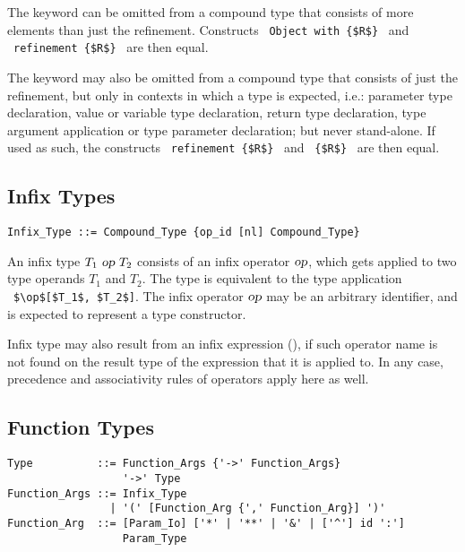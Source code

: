 The  keyword can be omitted from a compound type that consists of more elements than just the refinement. Constructs ~\lstinline!Object with {$R$}!~ and ~\lstinline!refinement {$R$}!~ are then equal. 

The  keyword may also be omitted from a compound type that consists of just the refinement, but only in contexts in which a type is expected, i.e.: parameter type declaration, value or variable type declaration, return type declaration, type argument application or type parameter declaration; but never stand-alone. If used as such, the constructs ~\lstinline!refinement {$R$}!~ and ~\lstinline!{$R$}!~ are then equal. 






\subsection{Infix Types}
\label{sec:infix-types}

\syntax\begin{lstlisting}
Infix_Type ::= Compound_Type {op_id [nl] Compound_Type}
\end{lstlisting}

An infix type $T_1\ \mbox{\sl op}\ T_2$ consists of an infix operator $\mbox{\sl op}$, which gets applied to two type operands $T_1$ and $T_2$. The type is equivalent to the type application ~\lstinline!$\op$[$T_1$, $T_2$]!. The infix operator $\mbox{\sl op}$ may be an arbitrary identifier, and is expected to represent a type constructor. 

Infix type may also result from an infix expression (), if such operator name is not found on the result type of the expression that it is applied to. In any case, precedence and associativity rules of operators apply here as well. 






\subsection{Function Types}
\label{sec:function-types}

\syntax\begin{lstlisting}
Type          ::= Function_Args {'->' Function_Args}
                  '->' Type
Function_Args ::= Infix_Type
                | '(' [Function_Arg {',' Function_Arg}] ')'
Function_Arg  ::= [Param_Io] ['*' | '**' | '&' | ['^'] id ':']
                  Param_Type
\end{lstlisting}

